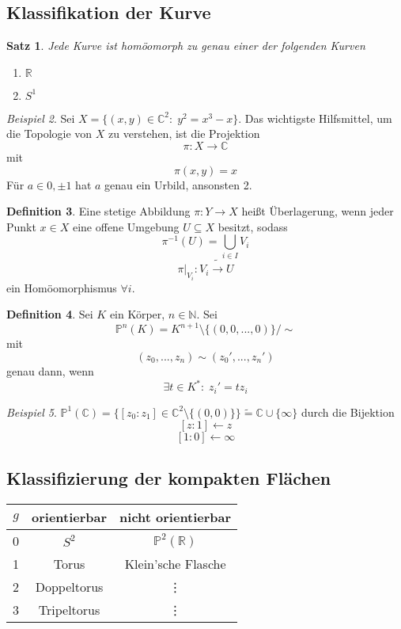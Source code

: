 \documentclass[a4paper, 12pt]{article}
\theoremstyle{plain}
\newtheorem{theorem}{Satz}[section] %
\theoremstyle{definition}
\newtheorem{definition}[theorem]{Definition} %
\theoremstyle{lemma}
\theoremstyle{remark}
\theoremstyle{corollary}
\theoremstyle{example}
\newtheorem{example}[theorem]{Beispiel}
\begin{document}
	\subsection{Klassifikation der Kurve}
	\begin{theorem}
		Jede Kurve ist homöomorph zu genau einer der folgenden Kurven \begin{enumerate}
			\item $\mathbb{R}$
			\item $S^1$
		\end{enumerate}
	\end{theorem}
	\begin{example}
		Sei $X = \{(x,y) \in \mathbb{C}^2 : \; y^2 = x^3 - x\}$. Das wichtigste Hilfsmittel, um die Topologie von $X$ zu verstehen, ist die Projektion \[\pi: X \to \mathbb{C}\] mit \[\pi(x,y) = x\] Für $a \in {0, \pm 1}$ hat $a$ genau ein Urbild, ansonsten 2.
	\end{example}
	\begin{definition}
		Eine stetige Abbildung $\pi:Y \to X$ heißt Überlagerung, wenn jeder Punkt $x \in X$ eine offene Umgebung $U \subseteq X$ besitzt, sodass \[\pi^{-1}(U) = \bigcup_{i \in I} V_i\] \[\pi|_{V_i} : V_i \tilde{\rightarrow} U\] ein Homöomorphismus $\forall i$. 
	\end{definition}
	\begin{definition}
		Sei $K$ ein Körper, $n \in \mathbb{N}$. Sei \[\mathbb{P}^n(K) = K^{n+1}\setminus\{(0,0,...,0)\}/\sim\]
		mit \[(z_0,...,z_n) \sim (z_0',...,z_n')\] genau dann, wenn \[\exists t \in K^* : \; z_i' = tz_i\]
	\end{definition}
	\begin{example}
		$\mathbb{P}^1(\mathbb{C}) = \{[z_0:z_1] \in \mathbb{C}^2 \setminus \{(0,0)\}\} \tilde{=} \mathbb{C} \cup \{\infty\}$ durch die Bijektion \[[z:1] \leftarrow z\]
		\[[1:0] \leftarrow \infty\]
	\end{example}
	\subsection{Klassifizierung der kompakten Flächen}
	\begin{table}[h]
		\centering
		\begin{tabular}{c | c | c}
			$g$ & orientierbar & nicht orientierbar\\
			\hline \hline
			0 & $S^2$ & $\mathbb{P}^2(\mathbb{R})$\\
			1 & Torus & Klein'sche Flasche\\
			2 & Doppeltorus & \vdots\\
			3 & Tripeltorus & \vdots
		\end{tabular}
	\end{table}
\end{document}
